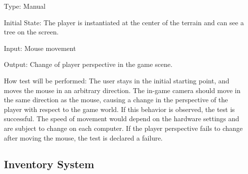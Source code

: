 \documentclass[12pt, titlepage]{article}
\begin{document}
\begin{enumerate}
Type: Manual
					
Initial State: The player is instantiated at the center of the terrain and can see a tree on the screen.
					
Input: Mouse movement
					
Output: Change of player perspective in the game scene.
					
How test will be performed: 
The user stays in the initial starting point, and moves the mouse in an arbitrary direction. The in-game camera should move in the same direction as the mouse, causing a change in the perspective of the player with respect to the game world. If this behavior is observed, the test is successful.
\newline
The speed of movement would depend on the hardware settings and are subject to change on each computer. If the player perspective fails to change after moving the mouse, the test is declared a failure. 

\end{enumerate}

\subsection{Inventory System}
\end{document}
